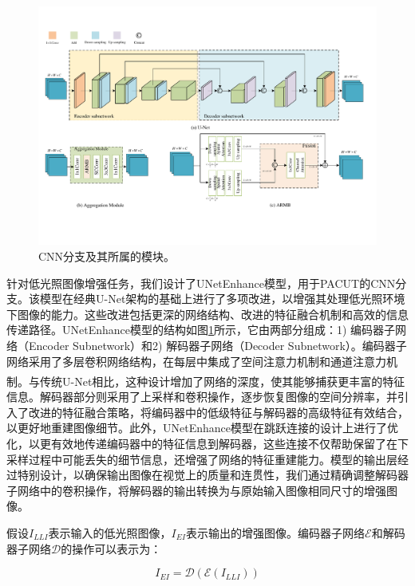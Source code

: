\documentclass[a4paper]{ctexart}
\newcommand{\upcite}[1]{\rmfamily\textsuperscript{\textsuperscript{\cite{#1}}}}
\begin{document}
\begin{figure}[htb]
	\centering 
	\includegraphics[width=\columnwidth]{picture/LLIE/My Architecture/U-Net and AM}
	\caption{
		\label{fig: U-Net and AM} 
		CNN分支及其所属的模块。
	}
\end{figure}

针对低光照图像增强任务，我们设计了UNetEnhance模型，用于PACUT的CNN分支。该模型在经典U-Net架构的基础上进行了多项改进，以增强其处理低光照环境下图像的能力。这些改进包括更深的网络结构、改进的特征融合机制和高效的信息传递路径。UNetEnhance模型的结构如图\ref{fig: U-Net and AM}所示，它由两部分组成：1) 编码器子网络（Encoder Subnetwork）和2) 解码器子网络（Decoder Subnetwork）。编码器子网络采用了多层卷积网络结构，在每层中集成了空间注意力机制和通道注意力机制\upcite{woo2018cbam}。与传统U-Net相比，这种设计增加了网络的深度，使其能够捕获更丰富的特征信息。解码器部分则采用了上采样和卷积操作，逐步恢复图像的空间分辨率，并引入了改进的特征融合策略，将编码器中的低级特征与解码器的高级特征有效结合，以更好地重建图像细节。此外，UNetEnhance模型在跳跃连接的设计上进行了优化，以更有效地传递编码器中的特征信息到解码器，这些连接不仅帮助保留了在下采样过程中可能丢失的细节信息，还增强了网络的特征重建能力。模型的输出层经过特别设计，以确保输出图像在视觉上的质量和连贯性，我们通过精确调整解码器子网络中的卷积操作，将解码器的输出转换为与原始输入图像相同尺寸的增强图像。
	
假设$I_{LLI}$表示输入的低光照图像，$I_{EI}$表示输出的增强图像。编码器子网络$\mathcal{E}$和解码器子网络$\mathcal{D}$的操作可以表示为：

\begin{equation}
	I_{EI} = \mathcal{D} \left( \mathcal{E} \left( I_{LLI} \right) \right)
\end{equation}
\end{document}
